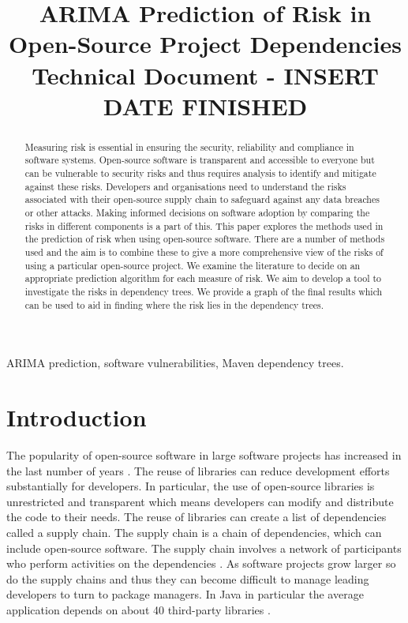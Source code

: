 \documentclass[conference]{IEEEtran}
\begin{document}
\title{ARIMA Prediction of Risk in \\Open-Source Project Dependencies\\
{\footnotesize Technical Document - INSERT DATE FINISHED}
}

\author{
\and
{}
    }

\maketitle
\thispagestyle{plain}
\pagestyle{plain}

\begin{abstract}
Measuring risk is essential in ensuring the security, reliability and compliance in software systems. Open-source software is transparent and accessible to everyone but can be vulnerable to security risks and thus requires analysis to identify and mitigate against these risks. Developers and organisations need to understand the risks associated with their open-source supply chain to safeguard against any data breaches or other attacks. Making informed decisions on software adoption by comparing the risks in different components is a part of this. This paper explores the methods used in the prediction of risk when using open-source software. There are a number of methods used and the aim is to combine these to give a more comprehensive view of the risks of using a particular open-source project. We examine the literature to decide on an appropriate prediction algorithm for each measure of risk. We aim to develop a tool to investigate the risks in dependency trees. We provide a graph of the final results which can be used to aid in finding where the risk lies in the dependency trees. 
\end{abstract}

\begin{IEEEkeywords}
ARIMA prediction, software vulnerabilities, Maven dependency trees.
\end{IEEEkeywords}

\section{Introduction}
The popularity of open-source software in large software projects has increased in the last number of years \cite{zajdel_open_2022}. The reuse of libraries can reduce development efforts substantially for developers. In particular, the use of open-source libraries is unrestricted and transparent which means developers can modify and distribute the code to their needs. The reuse of libraries can create a list of dependencies called a supply chain. The supply chain is a chain of dependencies, which can include open-source software. The supply chain involves a network of participants who perform activities on the dependencies \cite{k_singi_trusted_2019}. As software projects grow larger so do the supply chains and thus they can become difficult to manage leading developers to turn to package managers. In Java in particular the average application depends on about 40 third-party libraries \cite{a_m_mir_effect_2023}. 
\end{document}
